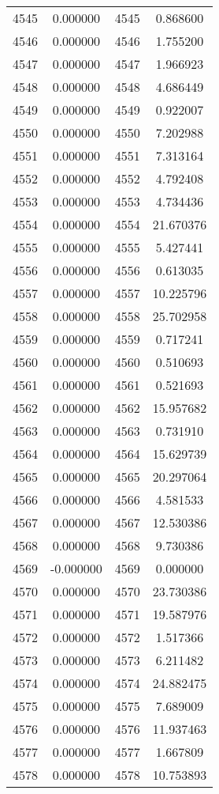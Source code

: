 \documentclass[12pt]{article}
\begin{document}
\begin{longtable}{@{}cccc@{}}
4545 & 0.000000 & 4545 & 0.868600 \\
4546 & 0.000000 & 4546 & 1.755200 \\
4547 & 0.000000 & 4547 & 1.966923 \\
4548 & 0.000000 & 4548 & 4.686449 \\
4549 & 0.000000 & 4549 & 0.922007 \\
4550 & 0.000000 & 4550 & 7.202988 \\
4551 & 0.000000 & 4551 & 7.313164 \\
4552 & 0.000000 & 4552 & 4.792408 \\
4553 & 0.000000 & 4553 & 4.734436 \\
4554 & 0.000000 & 4554 & 21.670376 \\
4555 & 0.000000 & 4555 & 5.427441 \\
4556 & 0.000000 & 4556 & 0.613035 \\
4557 & 0.000000 & 4557 & 10.225796 \\
4558 & 0.000000 & 4558 & 25.702958 \\
4559 & 0.000000 & 4559 & 0.717241 \\
4560 & 0.000000 & 4560 & 0.510693 \\
4561 & 0.000000 & 4561 & 0.521693 \\
4562 & 0.000000 & 4562 & 15.957682 \\
4563 & 0.000000 & 4563 & 0.731910 \\
4564 & 0.000000 & 4564 & 15.629739 \\
4565 & 0.000000 & 4565 & 20.297064 \\
4566 & 0.000000 & 4566 & 4.581533 \\
4567 & 0.000000 & 4567 & 12.530386 \\
4568 & 0.000000 & 4568 & 9.730386 \\
4569 & -0.000000 & 4569 & 0.000000 \\
4570 & 0.000000 & 4570 & 23.730386 \\
4571 & 0.000000 & 4571 & 19.587976 \\
4572 & 0.000000 & 4572 & 1.517366 \\
4573 & 0.000000 & 4573 & 6.211482 \\
4574 & 0.000000 & 4574 & 24.882475 \\
4575 & 0.000000 & 4575 & 7.689009 \\
4576 & 0.000000 & 4576 & 11.937463 \\
4577 & 0.000000 & 4577 & 1.667809 \\
4578 & 0.000000 & 4578 & 10.753893 \\

\end{longtable}
\end{document}
